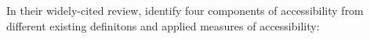 


In their widely-cited review, \citet{Geurs2004AccessibilityReview} identify four components of accessibility 
from different existing definitons and applied measures of accessibility:

